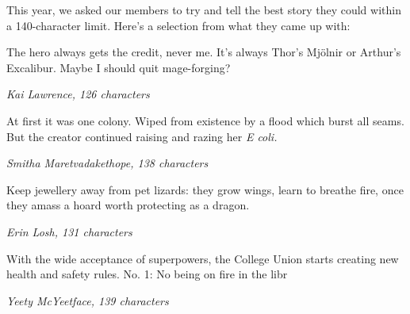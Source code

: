 
\newcommand{\microfiction}[3]{
  \vspace{\baselineskip}
  {\Large #2} \\[-0.6em] \begin{flushright}
    \textemdash{} \textit{#1, #3 characters}
  \end{flushright}
  \vspace{\baselineskip}
}

\begin{center}

  \begin{minipage}{0.72\textwidth}

    \vspace{1\baselineskip}

    This year, we asked our members to try and tell the best story
    they could within a 140-character limit. Here's a selection from
    what they came up with:

    \shorthline
    \microfiction{Kai Lawrence}{ The hero always gets the credit, never
      me. It's always Thor's Mjölnir or Arthur's Excalibur. Maybe I should
      quit mage-forging?}{126}

    \shorthline
    \microfiction{Smitha Maretvadakethope}{At first it was one
      colony. Wiped from existence by a flood which burst all seams. But
      the creator continued raising and razing her \textit{E coli.}}{138}

    \shorthline
    \microfiction{Erin Losh}{Keep jewellery away from pet lizards: they
      grow wings, learn to breathe fire, once they amass a hoard worth
      protecting as a dragon.}{131}

    \shorthline
    \microfiction{Yeety McYeetface\footnotemark}{With the wide acceptance of
      superpowers, the College Union starts creating new health
      and safety rules. No. 1: No being on fire in the libr}{139}

  \end{minipage}
\end{center}

